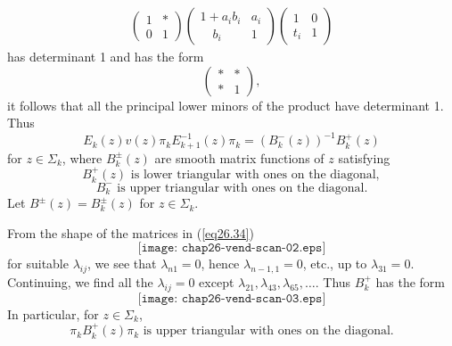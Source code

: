 \documentclass{surv-l}
\theoremstyle{plain}
\theoremstyle{definition}
\numberwithin{equation}{chapter}
\begin{document}
\begin{align*}
\left(\begin{array}{cc}
  1 & * \\
  0 & 1
\end{array}\right)\left(\begin{array}{ll}
1+a_{i}b_{i} & a_{i}\\
\quad b_{i}& 1
\end{array}\right)\left(\begin{array}{ll}
1 & 0\\
t_{i} & 1
\end{array}\right)
\end{align*}
has determinant 1 and has the form
\begin{equation*}
\left(\begin{array}{cc}
  * & * \\
  * & 1
\end{array}\right),
\end{equation*}
it follows that all the principal lower minors of the product have determinant 1.
Thus
\begin{equation}\label{eq26.34}
E_{k}(z)v(z)\pi_{k}E_{k+1}^{-1}(z)\pi_{k}=(B_{k}^{-}(z))^{-1}B_{k}^{+}(z)
\end{equation}
for $z\in\Sigma_{k}$, where $B_{k}^{\pm}(z)$ are smooth matrix functions of $z$ satisfying
\begin{equation}\label{eq26.35}
B_{k}^{+}(z)\text{ is lower triangular with ones on the diagonal},
\end{equation}
\begin{equation}\label{eq26.36}
B_{k}^{-} \text{ is upper triangular with ones on the diagonal}.
\end{equation}
Let $B^{\pm}(z)=B_{k}^{\pm}(z)$ for $z\in\Sigma_{k}$.

From the shape of the matrices in (\ref{eq26.34})\\
\begin{equation*}
\texttt{[image: chap26-vend-scan-02.eps]}
\end{equation*}
for suitable $\lambda_{ij}$, we see that $\lambda_{n1}=0$, hence $\lambda_{n-1,1}=0$, etc., up to $\lambda_{31}=0$. Continuing, we find all the $\lambda_{ij}=0$ except $\lambda_{21}, \lambda_{43}, \lambda_{65},\ldots.$ Thus $B_{k}^{+}$ has the form
\begin{equation*}
\texttt{[image: chap26-vend-scan-03.eps]}
\end{equation*}
In particular, for $z\in\Sigma_{k}$,
\begin{equation}\label{eq26.37}
\pi_{k}B_{k}^{+}(z)\pi_{k}\text{ is upper triangular with ones on the diagonal}.
\end{equation}
\end{document}
